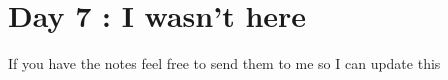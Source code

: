 \section{Day 7 : I wasn't here}

If you have the notes feel free to send them to me so I can update this